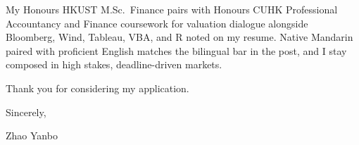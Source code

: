 \documentclass[10pt,a4paper]{article}
\begin{document}
My Honours HKUST M.Sc.\ Finance pairs with Honours CUHK Professional Accountancy and Finance coursework for valuation dialogue alongside Bloomberg, Wind, Tableau, VBA, and R noted on my resume. Native Mandarin paired with proficient English matches the bilingual bar in the post, and I stay composed in high stakes, deadline-driven markets.

Thank you for considering my application.

\vspace{1em}

Sincerely,

\vspace{2em}

Zhao Yanbo
\end{document}
